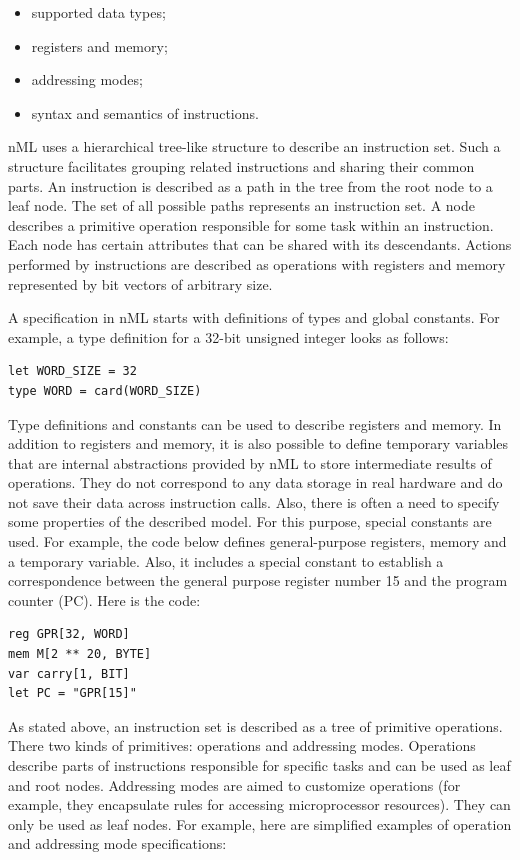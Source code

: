 \documentclass[oneside,final,14pt]{extreport}
\begin{document}
\begin{itemize}
\item supported data types;
\item registers and memory;
\item addressing modes;
\item syntax and semantics of instructions.
\end{itemize}

nML uses a hierarchical tree-like structure to describe an instruction set.
Such a structure facilitates grouping related instructions and sharing their
common parts. An instruction is described as a path in the tree from the root
node to a leaf node. The set of all possible paths represents an instruction
set. A node describes a primitive operation responsible for some task within
an instruction. Each node has certain attributes that can be shared with its
descendants. Actions performed by instructions are described as operations
with registers and memory represented by bit vectors of arbitrary size.

A specification in nML starts with definitions of types and global constants.
For example, a type definition for a 32-bit unsigned integer looks as follows:

\begin{lstlisting}
let WORD_SIZE = 32
type WORD = card(WORD_SIZE)
\end{lstlisting}

Type definitions and constants can be used to describe registers and memory.
In addition to registers and memory, it is also possible to define temporary
variables that are internal abstractions provided by nML to store intermediate
results of operations. They do not correspond to any data storage in real
hardware and do not save their data across instruction calls. Also, there is
often a need to specify some properties of the described model. For this
purpose, special constants are used. For example, the code below defines
general-purpose registers, memory and a temporary variable. Also, it includes
a special constant to establish a correspondence between the general purpose
register number 15 and the program counter (PC). Here is the code:

\begin{lstlisting}
reg GPR[32, WORD]
mem M[2 ** 20, BYTE]
var carry[1, BIT]
let PC = "GPR[15]"
\end{lstlisting}

As stated above, an instruction set is described as a tree of primitive
operations. There two kinds of primitives: operations and addressing modes.
Operations describe parts of instructions responsible for specific tasks and
can be used as leaf and root nodes. Addressing modes are aimed to customize
operations (for example, they encapsulate rules for accessing microprocessor
resources). They can only be used as leaf nodes. For example, here are
simplified examples of operation and addressing mode specifications:
\end{document}
